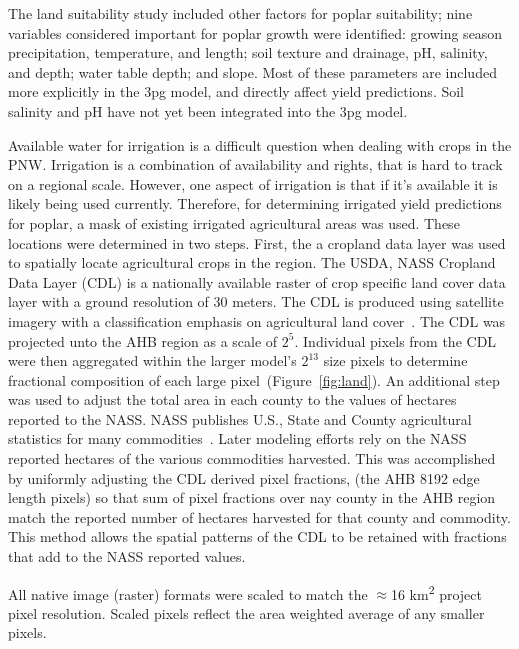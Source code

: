 \documentclass[preprint,12pt]{elsarticle}
\begin{document}
The land suitability study included other factors for poplar
suitability; nine variables considered important for poplar growth
were identified: growing season precipitation, temperature, and
length; soil texture and drainage, pH, salinity, and depth; water
table depth; and slope.  Most of these parameters are included more
explicitly in the \ac{3pg} model, and directly affect yield
predictions.  Soil salinity and pH have not yet been integrated into
the \ac{3pg} model.


Available water for irrigation is a difficult question when dealing
with crops in the \ac{PNW}.  Irrigation is a combination of
availability and rights, that is hard to track on a regional scale.
However, one aspect of irrigation is that if it's available it is
likely being used currently.  Therefore, for determining irrigated
yield predictions for poplar, a mask of existing irrigated
agricultural areas was used.  These locations were determined in two
steps.  First, the a cropland data layer was used to spatially locate
agricultural crops in the region.  The USDA, NASS Cropland Data Layer
(CDL) is a nationally available raster of crop specific land cover
data layer with a ground resolution of 30 meters.  The CDL is produced
using satellite imagery with a classification emphasis on agricultural
land cover~\cite{Boryan2011a}.  The CDL was projected unto the \ac{AHB}
region as a scale of $2^5$.  Individual pixels from the CDL were then
aggregated within the larger model's $2^{13}$ size pixels to determine
fractional composition of each large pixel~(Figure~\ref{fig:land}).  An
additional step was used to adjust the total area in each county to
the values of hectares reported to the \ac{NASS}.  \ac{NASS} publishes
U.S., State and County agricultural statistics for many
commodities~\cite{Service2015}.  Later modeling efforts rely on
the \ac{NASS} reported hectares of the various commodities harvested.
This was accomplished by uniformly adjusting the CDL derived pixel
fractions, (the \ac{AHB} 8192 edge length pixels) so that sum of pixel
fractions over nay county in the \ac{AHB} region match the reported
number of hectares harvested for that county and commodity.  This
method allows the spatial patterns of the CDL to be retained with
fractions that add to the \ac{NASS} reported values.

All native image (raster) formats were scaled to match the $\approx$16
km\textsuperscript{2} project pixel resolution. Scaled pixels reflect
the area weighted average of any smaller pixels.
\end{document}
